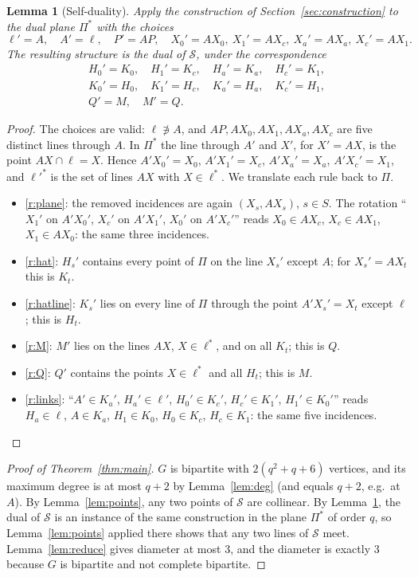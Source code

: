 \documentclass[11pt]{amsart}
\newtheorem{lemma}[theorem]{Lemma}
\theoremstyle{remark}
\newcommand{\cS}{\mathcal{S}}
\begin{document}
\begin{lemma}[Self-duality]\label{lem:dual}
Apply the construction of Section~\ref{sec:construction} to the dual plane $\Pi^*$ with the choices
\[ \ell' = A,\quad A' = \ell,\quad P' = AP,\quad X_0' = AX_0,\ X_1' = AX_c,\ X_a' = AX_a,\ X_c' = AX_1. \]
The resulting structure is the dual of $\cS$, under the correspondence
\begin{gather*} H_0' = K_0,\quad H_1' = K_c,\quad H_a' = K_a,\quad H_c' = K_1,\\ K_0' = H_0,\quad K_1' = H_c,\quad K_a' = H_a,\quad K_c' = H_1,\\ Q' = M,\quad M' = Q. \end{gather*}
\end{lemma}

\begin{proof}
The choices are valid: $\ell \not\ni A$, and $AP, AX_0, AX_1, AX_a, AX_c$ are five distinct lines through $A$. In $\Pi^*$ the line through $A'$ and $X'$, for $X' = AX$, is the point $AX \cap \ell = X$. Hence $A'X_0' = X_0$, $A'X_1' = X_c$, $A'X_a' = X_a$, $A'X_c' = X_1$, and $\ell'^{*}$ is the set of lines $AX$ with $X \in \ell^*$. We translate each rule back to $\Pi$.
\begin{itemize}[leftmargin=2em]
\item \ref{r:plane}: the removed incidences are again $(X_s, AX_s)$, $s\in S$. The rotation ``$X_1'$ on $A'X_0'$, $X_c'$ on $A'X_1'$, $X_0'$ on $A'X_c'$'' reads $X_0 \in AX_c$, $X_c \in AX_1$, $X_1 \in AX_0$: the same three incidences.
\item \ref{r:hat}: $H_s'$ contains every point of $\Pi$ on the line $X_s'$ except $A$; for $X_s' = AX_t$ this is $K_t$.
\item \ref{r:hatline}: $K_s'$ lies on every line of $\Pi$ through the point $A'X_s' = X_t$ except $\ell$; this is $H_t$.
\item \ref{r:M}: $M'$ lies on the lines $AX$, $X \in \ell^*$, and on all $K_t$; this is $Q$.
\item \ref{r:Q}: $Q'$ contains the points $X \in \ell^*$ and all $H_t$; this is $M$.
\item \ref{r:links}: ``$A' \in K_a'$, $H_a' \in \ell'$, $H_0' \in K_c'$, $H_c' \in K_1'$, $H_1' \in K_0'$'' reads $H_a \in \ell$, $A \in K_a$, $H_1 \in K_0$, $H_0 \in K_c$, $H_c \in K_1$: the same five incidences.\qedhere
\end{itemize}
\end{proof}

\begin{proof}[Proof of Theorem~\ref{thm:main}]
$G$ is bipartite with $2(q^2+q+6)$ vertices, and its maximum degree is at most $q+2$ by Lemma~\ref{lem:deg} (and equals $q+2$, e.g.\ at $A$). By Lemma~\ref{lem:points}, any two points of $\cS$ are collinear. By Lemma~\ref{lem:dual}, the dual of $\cS$ is an instance of the same construction in the plane $\Pi^*$ of order $q$, so Lemma~\ref{lem:points} applied there shows that any two lines of $\cS$ meet. Lemma~\ref{lem:reduce} gives diameter at most $3$, and the diameter is exactly $3$ because $G$ is bipartite and not complete bipartite.
\end{proof}
\end{document}

